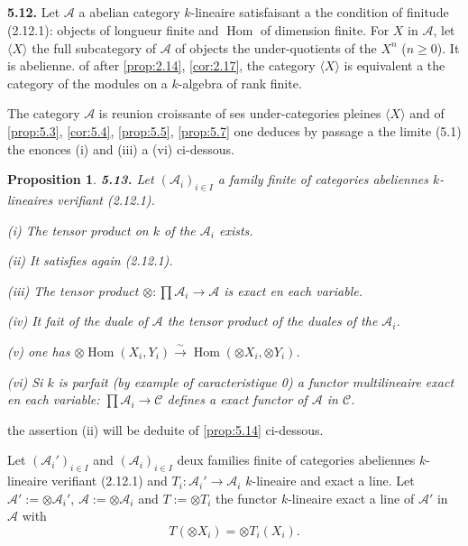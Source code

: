 \documentclass[12pt,a4paper]{article}
\theoremstyle{plain}
\newtheorem{proposition}[theorem]{Proposition}
\theoremstyle{definition}
\theoremstyle{remark}
\DeclareMathOperator{\Hom}{Hom}
\begin{document}
\subsection{}

\textbf{5.12.} Let $\mathcal{A}$ a abelian category $k$-lineaire satisfaisant a the condition of finitude (2.12.1): objects of longueur finite and $\Hom$ of dimension finite. For $X$ in $\mathcal{A}$, let $\langle X \rangle$ the full subcategory of $\mathcal{A}$ of objects the under-quotients of the $X^n$ ($n \geq 0$). It is abelienne. of after \ref{prop:2.14}, \ref{cor:2.17}, the category $\langle X \rangle$ is equivalent a the category of the modules on a $k$-algebra of rank finite.

The category $\mathcal{A}$ is reunion croissante of ses under-categories pleines $\langle X \rangle$ and of \ref{prop:5.3}, \ref{cor:5.4}, \ref{prop:5.5}, \ref{prop:5.7} one deduces by passage a the limite (5.1) the enonces (i) and (iii) a (vi) ci-dessous.

\begin{proposition}\label{prop:5.13}
\textbf{5.13.} Let $(\mathcal{A}_i)_{i \in I}$ a family finite of categories abeliennes $k$-lineaires verifiant (2.12.1).

(i) The tensor product on $k$ of the $\mathcal{A}_i$ exists.

(ii) It satisfies again (2.12.1).

(iii) The tensor product $\otimes : \prod \mathcal{A}_i \to \mathcal{A}$ is exact en each variable.

(iv) It fait of the duale of $\mathcal{A}$ the tensor product of the duales of the $\mathcal{A}_i$.

(v) one has $\otimes \Hom(X_i, Y_i) \xrightarrow{\sim} \Hom(\otimes X_i, \otimes Y_i)$.

(vi) Si $k$ is parfait (by example of caracteristique 0) a functor multilineaire exact en each variable: $\prod \mathcal{A}_i \to \mathcal{C}$ defines a exact functor of $\mathcal{A}$ in $\mathcal{C}$.
\end{proposition}

the assertion (ii) will be deduite of \ref{prop:5.14} ci-dessous.

Let $(\mathcal{A}_i')_{i \in I}$ and $(\mathcal{A}_i)_{i \in I}$ deux families finite of categories abeliennes $k$-lineaire verifiant (2.12.1) and $T_i : \mathcal{A}_i' \to \mathcal{A}_i$ $k$-lineaire and exact a line. Let $\mathcal{A}' := \otimes \mathcal{A}_i'$, $\mathcal{A} := \otimes \mathcal{A}_i$ and $T := \otimes T_i$ the functor $k$-lineaire exact a line of $\mathcal{A}'$ in $\mathcal{A}$ with
\[
T(\otimes X_i) = \otimes T_i(X_i).
\]
\end{document}
